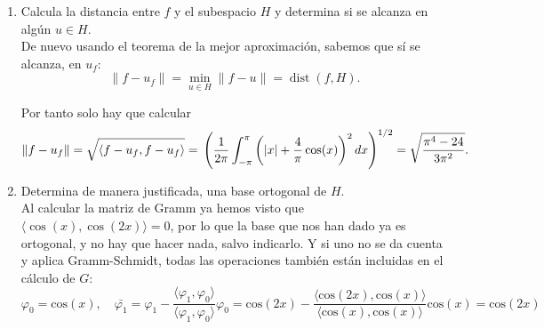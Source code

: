 \documentclass[12pt]{article}
\begin{document}
\begin{ejercicio}[4 puntos]
\begin{enumerate}[label=\alph*)]
				
				
			\item Calcula la distancia entre $f$ y el subespacio $H$ y determina si se alcanza en algún $u \in H$. \\
			
			De nuevo usando el teorema de la mejor aproximación, sabemos que sí se alcanza, en $u_f$:
			$$\|f - u_f\| = \min_{u \in H} \|f - u\| = \operatorname{dist}(f, H).$$
			
			Por tanto solo hay que calcular
			$$ \|f - u_f\| = \sqrt{\langle f - u_f, f - u_f \rangle} = \\
			\left( \frac{1}{2\pi} \int_{-\pi}^{\pi} \left( |x| + \frac{4}{\pi} \cos(x) \right)^2 dx \right)^{1/2} = \\
			\sqrt{\frac{\pi^4 -24}{ 3\pi^2}}. $$
			
			\item Determina de manera justificada, una base ortogonal de $H$. \\
			
			Al calcular la matriz de Gramm ya hemos visto que $\langle \cos(x), \cos(2x) \rangle = 0$, por lo que la base que nos han dado ya es ortogonal, y no hay que hacer nada, salvo indicarlo. Y si uno no se da cuenta y aplica Gramm-Schmidt, todas las operaciones también están incluidas en el cálculo de $G$:
			$$\varphi_0 = \text{cos}(x), \quad \bar{\varphi_1}= \varphi_1 - \frac{\langle \varphi_1, \varphi_0 \rangle }{\langle \varphi_1, \varphi_0 \rangle}\varphi_0 = \text{cos}(2x) - \frac{\langle \text{cos}(2x), \text{cos}(x) \rangle}{\langle \text{cos}(x), \text{cos}(x) \rangle}\text{cos}(x) = \text{cos}(2x)$$
			
			
		\end{enumerate}
	\end{ejercicio}

	
\end{document}
